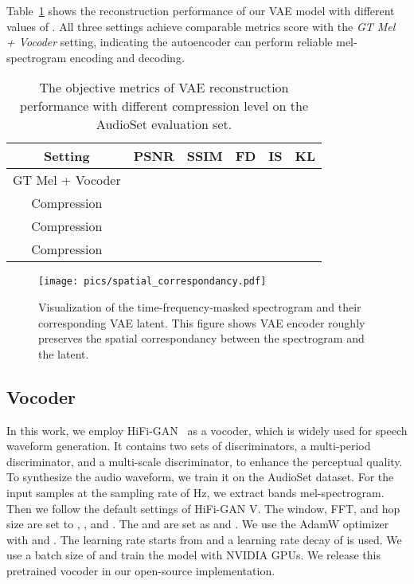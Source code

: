 \documentclass{article}
\begin{document}
Table~\ref{tab: vae-reconstruct} shows the reconstruction performance of our VAE model with different values of . All three settings achieve comparable metrics score with the \textit{GT Mel + Vocoder} setting, indicating the autoencoder can perform reliable mel-spectrogram encoding and decoding.



\begin{table}[htbp]
\small
\centering
\begin{tabular}{cccccc}
\toprule
        Setting        & PSNR  & SSIM & FD   & IS   & KL   \\
\midrule
GT Mel + Vocoder &  &  &  &  &  \\
\midrule
Compression     &  &  &  &  &  \\
Compression     &  &  &  &  &  \\
Compression    &  &  &  &  &  \\
\bottomrule
\end{tabular}
\caption{The objective metrics of VAE reconstruction performance with different compression level  on the AudioSet evaluation set.}
\label{tab: vae-reconstruct}
\end{table}

\begin{figure}[htbp]
    \centering
    \texttt{[image: pics/spatial\_correspondancy.pdf]}
    \caption{Visualization of the time-frequency-masked spectrogram and their corresponding VAE latent. This figure shows VAE encoder roughly preserves the spatial correspondancy between the spectrogram and the latent.}
    \label{fig:demo-spatial-correspondancy}
\end{figure}

\subsection{Vocoder}
\label{app:HiFi-GAN}

In this work, we employ HiFi-GAN~\cite{kong2020hifi} as a vocoder, which is widely used for speech waveform generation. It contains two sets of discriminators, a multi-period discriminator, and a multi-scale discriminator, to enhance the perceptual quality. To synthesize the audio waveform, we train it on the AudioSet dataset. For the input samples at the sampling rate of Hz, we extract  bands mel-spectrogram. Then we follow the default settings of HiFi-GAN V. The window, FFT, and hop size are set to , , and . The  and  are set as  and . We use the AdamW optimizer with  and . The learning rate starts from  and a learning rate decay of  is used. We use a batch size of  and train the model with  NVIDIA  GPUs. We release this pretrained vocoder in our open-source implementation.
\end{document}

